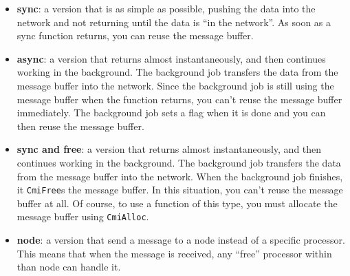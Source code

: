 \begin{itemize}

\item{{\bf sync}: a version that is as simple as possible, pushing the
data into the network and not returning until the data is ``in the
network''.  As soon as a sync function returns, you can reuse the
message buffer.}

\item{{\bf async}: a version that returns almost instantaneously, and then
continues working in the background.  The background job transfers the
data from the message buffer into the network.  Since the background job
is still using the message buffer when the function returns, you can't
reuse the message buffer immediately.  The background job sets a flag
when it is done and you can then reuse the message buffer.}

\item{{\bf sync and free}: a version that returns almost instantaneously,
and then continues working in the background.  The background job
transfers the data from the message buffer into the network.  When the
background job finishes, it {\tt CmiFree}s the message buffer.  In
this situation, you can't reuse the message buffer at all.  Of course,
to use a function of this type, you must allocate the message buffer
using {\tt CmiAlloc}.}

\item{{\bf node}: a version that send a message to a node instead of a
specific processor. This means that when the message is received, any ``free''
processor within than node can handle it.}

\end{itemize}




